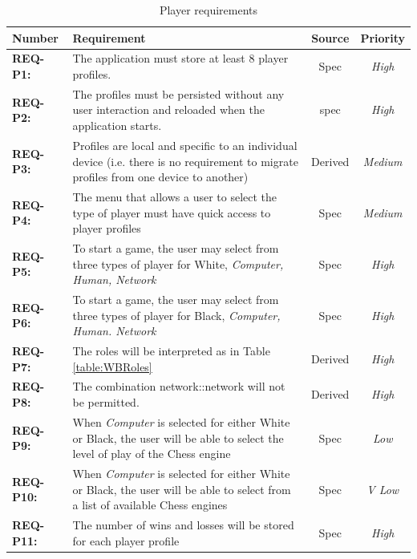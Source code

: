 \documentclass[a4paper,10pt]{article}
\begin{document}
\begin{table}[H]
\caption{Player requirements}
\label{table:playerReqs}
\begin{tabular}{|| l | p{10.5cm}  |  c  | c ||} \hline  
\textbf{Number} & \textbf{Requirement} & \textbf{Source} & \textbf{Priority}\\ \hline
\textbf{REQ-P1:}  & The application must store at least 8 player profiles.  & Spec & \textit{ High} \\

\textbf{REQ-P2:} & The profiles must be persisted without any user interaction and reloaded when the application starts.  & spec & \textit{High}\\

\textbf{REQ-P3:} &  Profiles are local and specific to an individual device (i.e. there is no requirement to migrate profiles from one device to another) 
& Derived & \textit{Medium}\\

\textbf{REQ-P4:} &  The menu that allows a user to select the type of player must have quick access to player profiles
& Spec  &  \textit{Medium}\\

\textbf{REQ-P5:} 
&  To start a game, the user may select from three types of player for White, \textit{Computer, Human, Network}
& Spec  &  \textit{High}\\
\textbf{REQ-P6:} 
&  To start a game, the user may select from three types of player for Black, \textit{Computer, Human. Network}
& Spec  &  \textit{High}\\
\textbf{REQ-P7:} 
& The roles will be interpreted as in Table \ref{table:WBRoles} & Derived & \textit{High} \\
\textbf{REQ-P8:}
& The combination network::network will not be permitted.
& Derived &\textit{High}\\

\textbf{REQ-P9:} 
&  When \textit{Computer} is selected for either White or Black, the user will be able to select the level of play of the Chess engine
& Spec  &  \textit{Low}\\

\textbf{REQ-P10:} 
&  When \textit{Computer} is selected for either White or Black, the user will be able to select from a list of available Chess engines
& Spec  &  \textit{V Low}\\

\textbf{REQ-P11:} 
&  The number of wins and losses will be stored for each player profile
& Spec  &  \textit{High}\\

\hline
\end{tabular}
\end{table}
\end{document}
